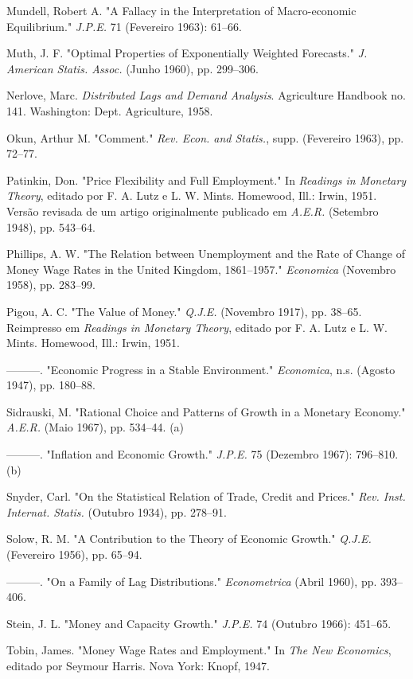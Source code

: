 \documentclass[12pt]{article}
\begin{document}
Mundell, Robert A. "A Fallacy in the Interpretation of Macro-economic Equilibrium." \textit{J.P.E.} 71 (Fevereiro 1963): 61–66.

Muth, J. F. "Optimal Properties of Exponentially Weighted Forecasts." \textit{J. American Statis. Assoc.} (Junho 1960), pp. 299–306.

Nerlove, Marc. \textit{Distributed Lags and Demand Analysis}. Agriculture Handbook no. 141. Washington: Dept. Agriculture, 1958.

Okun, Arthur M. "Comment." \textit{Rev. Econ. and Statis.}, supp. (Fevereiro 1963), pp. 72–77.

Patinkin, Don. "Price Flexibility and Full Employment." In \textit{Readings in Monetary Theory}, editado por F. A. Lutz e L. W. Mints. Homewood, Ill.: Irwin, 1951. Versão revisada de um artigo originalmente publicado em \textit{A.E.R.} (Setembro 1948), pp. 543–64.

Phillips, A. W. "The Relation between Unemployment and the Rate of Change of Money Wage Rates in the United Kingdom, 1861–1957." \textit{Economica} (Novembro 1958), pp. 283–99.

Pigou, A. C. "The Value of Money." \textit{Q.J.E.} (Novembro 1917), pp. 38–65. Reimpresso em \textit{Readings in Monetary Theory}, editado por F. A. Lutz e L. W. Mints. Homewood, Ill.: Irwin, 1951.

———. "Economic Progress in a Stable Environment." \textit{Economica}, n.s. (Agosto 1947), pp. 180–88.

Sidrauski, M. "Rational Choice and Patterns of Growth in a Monetary Economy." \textit{A.E.R.} (Maio 1967), pp. 534–44. (a)

———. "Inflation and Economic Growth." \textit{J.P.E.} 75 (Dezembro 1967): 796–810. (b)

Snyder, Carl. "On the Statistical Relation of Trade, Credit and Prices." \textit{Rev. Inst. Internat. Statis.} (Outubro 1934), pp. 278–91.

Solow, R. M. "A Contribution to the Theory of Economic Growth." \textit{Q.J.E.} (Fevereiro 1956), pp. 65–94.

———. "On a Family of Lag Distributions." \textit{Econometrica} (Abril 1960), pp. 393–406.

Stein, J. L. "Money and Capacity Growth." \textit{J.P.E.} 74 (Outubro 1966): 451–65.

Tobin, James. "Money Wage Rates and Employment." In \textit{The New Economics}, editado por Seymour Harris. Nova York: Knopf, 1947.
\end{document}
